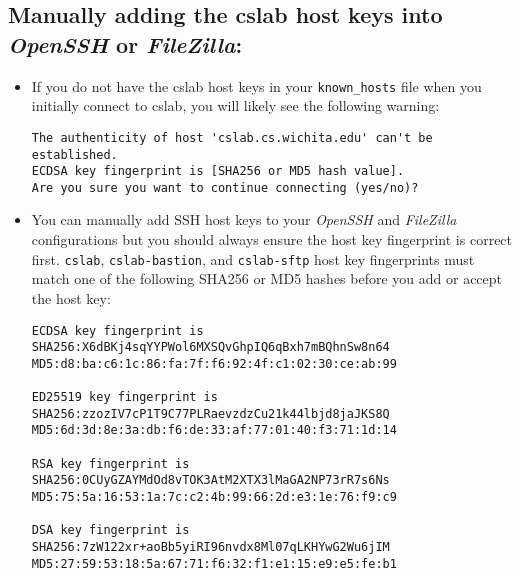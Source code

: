 \documentclass[12pt]{article}
\begin{document}
\begin{flushleft}
\subsection*{Manually adding the cslab host keys into \textit{OpenSSH} or \textit{FileZilla}:}
\begin{itemize}
\item If you do not have the cslab host keys in your \verb|known_hosts| file when you initially connect to cslab, you will likely see the following warning:
\begin{verbatim}
The authenticity of host 'cslab.cs.wichita.edu' can't be established.
ECDSA key fingerprint is [SHA256 or MD5 hash value].
Are you sure you want to continue connecting (yes/no)?
\end{verbatim}
\item You can manually add SSH host keys to your \textit{OpenSSH} and \textit{FileZilla} configurations but you should always ensure the host key fingerprint is correct first. \verb|cslab|, \verb|cslab-bastion|, and \verb|cslab-sftp| host key fingerprints must match one of the following SHA256 or MD5 hashes before you add or accept the host key:
\begin{verbatim}
ECDSA key fingerprint is
SHA256:X6dBKj4sqYYPWol6MXSQvGhpIQ6qBxh7mBQhnSw8n64
MD5:d8:ba:c6:1c:86:fa:7f:f6:92:4f:c1:02:30:ce:ab:99

ED25519 key fingerprint is
SHA256:zzozIV7cP1T9C77PLRaevzdzCu21k44lbjd8jaJKS8Q
MD5:6d:3d:8e:3a:db:f6:de:33:af:77:01:40:f3:71:1d:14

RSA key fingerprint is
SHA256:0CUyGZAYMdOd8vTOK3AtM2XTX3lMaGA2NP73rR7s6Ns
MD5:75:5a:16:53:1a:7c:c2:4b:99:66:2d:e3:1e:76:f9:c9

DSA key fingerprint is
SHA256:7zW122xr+aoBb5yiRI96nvdx8Ml07qLKHYwG2Wu6jIM
MD5:27:59:53:18:5a:67:71:f6:32:f1:e1:15:e9:e5:fe:b1
\end{verbatim}

\end{itemize}


\end{flushleft}
\end{document}
